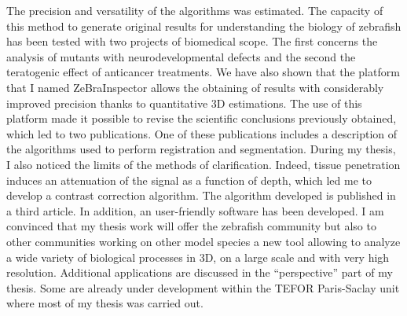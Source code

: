The precision and versatility of the algorithms was estimated. The capacity of this method to generate original results for understanding the biology of zebrafish has been tested with two projects of biomedical scope. The first concerns the analysis of mutants with neurodevelopmental defects and the second the teratogenic effect of anticancer treatments. We have also shown that the platform that I named ZeBraInspector allows the obtaining of results with considerably improved precision thanks to quantitative 3D estimations. The use of this platform made it possible to revise the scientific conclusions previously obtained, which led to two publications. One of these publications includes a description of the algorithms used to perform registration and segmentation. During my thesis, I also noticed the limits of the methods of clarification. Indeed, tissue penetration induces an attenuation of the signal as a function of depth, which led me to develop a contrast correction algorithm. The algorithm developed is published in a third article. In addition, an user-friendly software has been developed. I am convinced that my thesis work will offer the zebrafish community but also to other communities working on other model species a new tool allowing to analyze a wide variety of biological processes in 3D, on a large scale and with very high resolution. Additional applications are discussed in the “perspective” part of my thesis. Some are already under development within the TEFOR Paris-Saclay unit where most of my thesis was carried out.


\endgroup			

\vfill